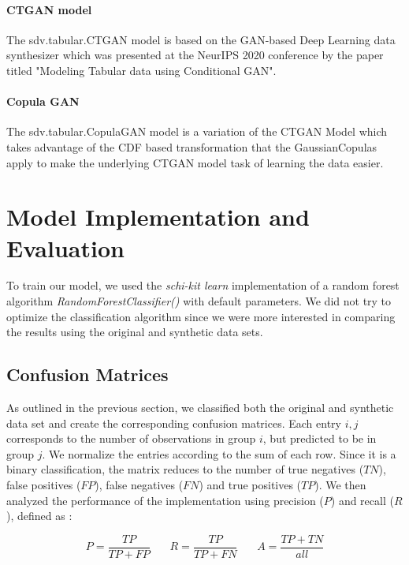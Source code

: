 \documentclass{article}
\begin{document}
\paragraph{CTGAN model}
The sdv.tabular.CTGAN model \cite{ctgan} is based on the GAN-based Deep Learning data synthesizer which was presented at the NeurIPS 2020 conference by the paper titled "Modeling Tabular data using Conditional GAN".
\paragraph{Copula GAN}
The sdv.tabular.CopulaGAN model \cite{copulagan} is a variation of the CTGAN Model which takes advantage of the CDF based transformation that the GaussianCopulas apply to make the underlying CTGAN model task of learning the data easier.



\section{Model Implementation and Evaluation}

To train our model, we used the \textit{schi-kit learn} implementation of a random forest algorithm \textit{RandomForestClassifier()} with default parameters. We did not try to optimize the classification algorithm since we were more interested in comparing the results using the original and synthetic data sets.
\\


\subsection{Confusion Matrices}
As outlined in the previous section, we classified both the original and synthetic data set and create the corresponding confusion matrices. Each entry $i,j$ corresponds to the number of observations in group $i$, but predicted to be in group $j$. We normalize the entries according to the sum of each row. Since it is a binary classification, the matrix reduces to the number of true negatives ($TN$), false positives ($FP$), false negatives ($FN$) and true positives ($TP$). We then analyzed the performance of the implementation using   precision ($P$) and recall ($R$), defined as :

\begin{equation}
P = \frac{TP}{TP + FP} \ \ \ \ \ \ \ \  R = \frac{TP}{TP + FN} \ \ \ \ \ \ \ \  A = \frac{TP + TN}{all}
\end{equation}
\end{document}
